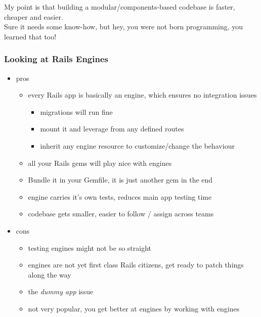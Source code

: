 \documentclass[compress]{beamer}
\begin{document}
\begin{frame}
  \begin{center}
    \huge My point is that building a modular/components-based codebase is faster, cheaper and easier.
    \\
    \small Sure it needs some know-how, but hey, you were not born programming, you learned that too!
  \end{center}
\end{frame}

\begin{frame}
\frametitle{Looking at Rails Engines}

\begin{itemize}[<+->]
  \item pros
    \begin{itemize}
      \item every Rails app is basically an engine, which ensures no integration issues
        \begin{itemize}
          \item migrations will run fine
          \item mount it and leverage from any defined routes
          \item inherit any engine resource to customize/change the behaviour
        \end{itemize}
      \item all your Rails gems will play nice with engines
      \item Bundle it in your Gemfile, it is just another gem in the end
      \item engine carries it's own tests, reduces main app testing time
      \item codebase gets smaller, easier to follow / assign across teams
    \end{itemize}
  \item cons
    \begin{itemize}
      \item testing engines might not be so straight
      \item engines are not yet first class Rails citizens, get ready to patch things along the way
      \item the \emph{dummy app} issue
      \item not very popular, you get better at engines by working with engines
    \end{itemize}
\end{itemize}
\end{frame}
\end{document}
